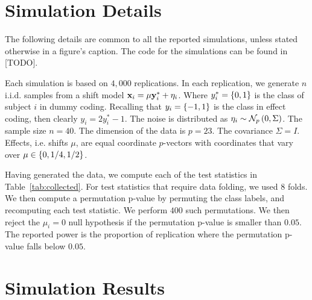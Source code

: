 \documentclass[12pt,a4paper]{article}
\begin{document}
\newpage
\section{Simulation Details}
\label{apx:simulation_details}

The following details are common to all the reported simulations, unless stated otherwise in a figure's caption. 
The \R code for the simulations can be found in [TODO].

Each simulation is based on $4,000$ replications. 
In each replication, we generate $n$ i.i.d. samples from a shift model $\mathbf{x}_i = \mu \mathbf{y}^*_i + \eta_i$.
Where $y^*_i=\{ 0,1 \}$ is the class of subject $i$ in dummy coding. 
Recalling that $y_i=\{ -1,1 \}$ is the class in effect coding, then clearly $y_i=2 y^*_i-1$.
The noise is distributed as $\eta_i \sim \mathcal{N}_{p}\left(0,\Sigma\right)$. 
The sample size $n=40$. 
The dimension of the data is $p=23$. 
The covariance $\Sigma=I$. 
Effects, i.e. shifts $\mu$, are equal coordinate $p$-vectors with coordinates that vary over $\mu \in \{ 0,1/4,1/2 \}$.

Having generated the data, we compute each of the test statistics in Table~\ref{tab:collected}.
For test statistics that require data folding, we used $8$ folds. 
We then compute a permutation p-value by permuting the class labels, and recomputing each test statistic. 
We perform $400$ such permutations. 
We then reject the $\mu_i=0$ null hypothesis if the permutation p-value is smaller than $0.05$.
The reported power is the proportion of replication where the permutation p-value falls below $0.05$.




\newpage
\section{Simulation Results}
\label{apx:simulations}
\end{document}
